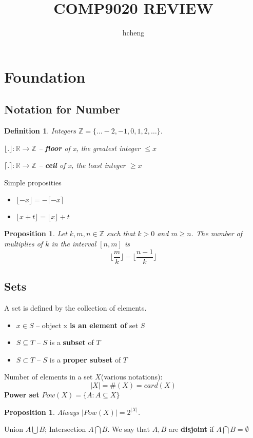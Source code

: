 \documentclass{ctexart}
\title{COMP9020 REVIEW}
\author{hcheng}
\newtheorem{proposition}[theorem]{\indent Proposition}
\newtheorem{definition}{\indent Definition}[section]
\begin{document}
\maketitle
\section{Foundation}
\subsection{Notation for Number}
\begin{definition}

    Integers $\mathbb{Z} = \{\ldots -2, -1, 0, 1, 2, \ldots \}$.

              $\lfloor . \rfloor : \mathbb{R} \rightarrow \mathbb{Z}$ -- \textbf{floor} of x, the greatest integer $\leqslant x$

              $\lceil . \rceil : \mathbb{R} \rightarrow \mathbb{Z}$ -- \textbf{ceil} of x, the least integer $\geqslant  x$
\end{definition}
Simple proposities
\begin{itemize}[leftmargin = 50 pt]
    \item    
        $\lfloor -x \rfloor = - \lceil -x \rceil$
    \item    
        $\lfloor x + t \rfloor = \lfloor x \rfloor + t$
\end{itemize}
\begin{proposition}
    Let $k, m, n \in \mathbb{Z}$ such that $k > 0$ and $m \geqslant n $. The number of multiplies of $k$ in the interval $\left[ n, m \right] $ is 
    \[
        \lfloor \frac{m}{k} \rfloor - \lfloor \frac{n-1}{k} \rfloor
    \]
\end{proposition}
\subsection{Sets}
A set is defined by the collection of elements.
\begin{itemize}[leftmargin = 50 pt]
    \item    
        $x \in S$ -- object x \textbf{is an element of} set $S$
    \item    
        $S \subseteq T$ -- $S$ is a \textbf{subset} of $T$
    \item    
        $S \subset T$ -- $S$ is a \textbf{proper subset} of $T$
\end{itemize}
Number of elements in a set $X$(various notations):
\[
    \left\lvert X \right\rvert = \#(X) = card(X)
\]
\textbf{Power set} $Pow(X) = \{A:A\subseteq X\}$
\begin{proposition}
    Always $\left\lvert Pow(X) \right\rvert = 2^{\left\lvert X \right\rvert}$.
\end{proposition}
Union $A\bigcup B$; Intersection $A \bigcap B$.
We say that $A,B$ are \textbf{disjoint} if $A \bigcap B = \emptyset$
\end{document}
